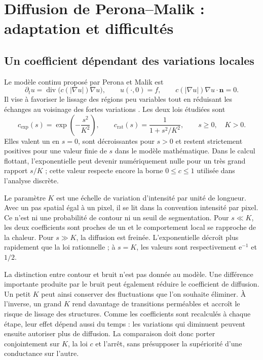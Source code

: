 \section{Diffusion de Perona--Malik : adaptation et difficultés}
\label{sec:perona-malik}

\subsection{Un coefficient dépendant des variations locales}

Le modèle continu proposé par Perona et Malik est
\begin{equation}
 \partial_t u=\operatorname{div}\bigl(c(|\nabla u|)\nabla u\bigr),
 \qquad u(\cdot,0)=f,
 \qquad c(|\nabla u|)\nabla u\cdot\boldsymbol n=0.
 \label{eq:pm-continuous}
\end{equation}
Il vise à favoriser le lissage des régions peu variables tout en
réduisant les échanges au voisinage des fortes variations
\cite{perona1990}. Les deux lois étudiées sont
\begin{equation}
 c_{\mathrm{exp}}(s)=\exp\left(-\frac{s^2}{K^2}\right),\qquad
 c_{\mathrm{rat}}(s)=\frac{1}{1+s^2/K^2},\qquad s\geq0,
 \quad K>0.
 \label{eq:pm-conductances}
\end{equation}
Elles valent un en $s=0$, sont décroissantes pour $s>0$ et restent
strictement positives pour une valeur finie de $s$ dans le modèle
mathématique. Dans le calcul flottant, l'exponentielle peut devenir
numériquement nulle pour un très grand rapport $s/K$ ; cette valeur
respecte encore la borne $0\leq c\leq1$ utilisée dans l'analyse discrète.

Le paramètre $K$ est une échelle de variation d'intensité par unité de
longueur. Avec un pas spatial égal à un pixel, il se lit dans la
convention intensité par pixel. Ce n'est ni une probabilité de contour
ni un seuil de segmentation. Pour $s\ll K$, les deux coefficients sont
proches de un et le comportement local se rapproche de la chaleur.
Pour $s\gg K$, la diffusion est freinée. L'exponentielle décroît plus
rapidement que la loi rationnelle ; à $s=K$, les valeurs sont
respectivement $\mathrm e^{-1}$ et $1/2$.

La distinction entre contour et bruit n'est pas donnée au modèle.
Une différence importante produite par le bruit peut également
réduire le coefficient de diffusion. Un petit $K$ peut ainsi conserver
des fluctuations que l'on souhaite éliminer. À l'inverse, un grand $K$
rend davantage de transitions perméables et accroît le risque de
lissage des structures. Comme les coefficients sont recalculés à
chaque étape, leur effet dépend aussi du temps : les variations qui
diminuent peuvent ensuite autoriser plus de diffusion. La comparaison
doit donc porter conjointement sur $K$, la loi $c$ et l'arrêt, sans
présupposer la supériorité d'une conductance sur l'autre.


